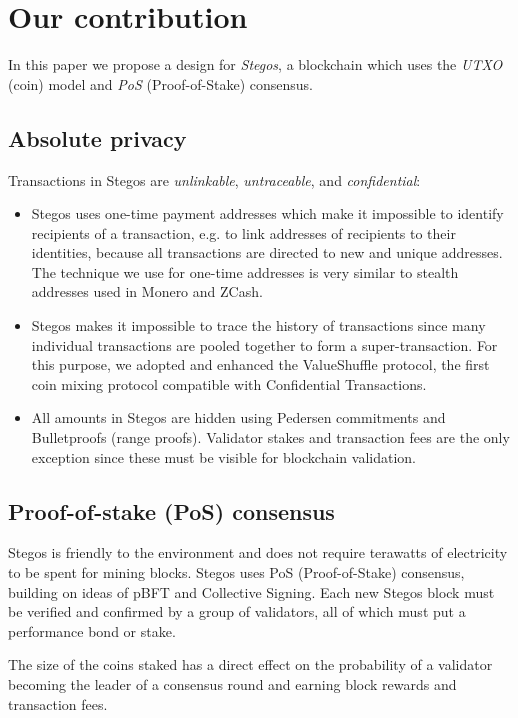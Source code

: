 \documentclass[a4paper, 10pt, conference]{ieeeconf}
\begin{document}
\section{Our contribution}
In this paper we propose a design for \textit{Stegos}, a blockchain which uses the \textit{UTXO} (coin) model and \textit{PoS} (Proof-of-Stake) consensus.

\subsection{Absolute privacy}
Transactions in Stegos are \textit{unlinkable}, \textit{untraceable}, and \textit{confidential}:

\begin{itemize}
	\item {Stegos uses one-time payment addresses which make it impossible to identify recipients of a transaction, e.g. to link addresses of recipients to their identities, because all transactions are directed to new and unique addresses. The technique we use for one-time addresses is very similar to stealth addresses used in Monero and ZCash.}
	\item {Stegos makes it impossible to trace the history of transactions since many individual transactions are pooled together to form a super-transaction. For this purpose, we adopted and enhanced the ValueShuffle protocol\cite{c7}, the first coin mixing protocol compatible with Confidential Transactions.}
	\item {All amounts in Stegos are hidden using Pedersen commitments\cite{c8} and Bulletproofs (range proofs)\cite{c4}. Validator stakes and transaction fees are the only exception since these must be visible for blockchain validation.}
\end{itemize}

\subsection{Proof-of-stake (PoS) consensus}
Stegos is friendly to the environment and does not require terawatts of electricity to be spent for mining blocks. Stegos uses PoS (Proof-of-Stake) consensus, building on ideas of pBFT\cite{c9} and Collective Signing\cite{c10}\cite{c11}. Each new Stegos block must be verified and confirmed by a group of validators, all of which must put a performance bond or stake.

The size of the coins staked has a direct effect on the probability of a validator becoming the leader of a consensus round and earning block rewards and transaction fees.
\end{document}

